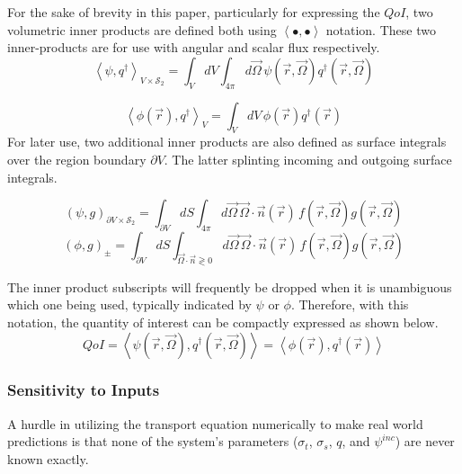 \documentclass{article}
\newcommand{\vr}{\vec{r}}
\newcommand{\vO}{\vec{\Omega}}
\newcommand{\bra}{\left\langle}
\newcommand{\ket}{\right\rangle}
\newcommand{\vn}{\vec{n}}
\newcommand{\sigt}{\sigma_t}
\newcommand{\sigs}{\sigma_s}
\newcommand{\angResp}{q^\dag}
\newcommand{\scalResp}{q^\dag}
\newcommand{\qoi}{QoI}
\begin{document}
For the sake of brevity in this paper, particularly for expressing the $\qoi$, two volumetric inner products are defined both using $\bra \bullet , \bullet \ket$ notation. These two inner-products are for use with angular and scalar flux respectively. 
\begin{equation}
\bra \psi , \angResp \ket_{V \times \mathcal{S}_2}  = \int_V dV \int_{4 \pi} d \vO \,  \psi(\vr, \vO)\angResp(\vr, \vO)
\end{equation}

\begin{equation}
\bra \phi(\vr) ,\angResp \ket_V  = \int_V dV \,  \phi(\vr)\angResp(\vr)
\end{equation}
For later use, two additional inner products are also defined as surface integrals over the region boundary $\partial V$. The latter splinting incoming and outgoing surface integrals.

\begin{equation}
( \psi , g )_{\partial V \times \mathcal{S}_2}  = \int_{\partial V} dS \int_{4 \pi} d \vO \, \vO \cdot \vn(\vr) \, f(\vr, \vO)g(\vr, \vO)
\end{equation}
\begin{equation}
( \phi , g )_{\pm}   = \int_{\partial V} dS \int_{\vO \cdot \vn \gtrless 0} d\vO \,  \vO \cdot \vn(\vr) \, f(\vr, \vO)g(\vr, \vO)
\end{equation}


The inner product subscripts will frequently be dropped when it is unambiguous which one being used, typically indicated by $\psi$ or $\phi$. Therefore, with this notation, the quantity of interest can be compactly expressed as shown below.
\begin{equation}
\label{QoIDef}
\qoi = \bra \psi(\vr,\vO), \angResp(\vr,\vO) \ket = \bra \phi(\vr) , \scalResp(\vr) \ket
\end{equation}

\subsubsection{Sensitivity to Inputs}
A hurdle in utilizing the transport equation numerically to make real world predictions is that none of the system's parameters ($\sigt$, $\sigs$, $q$, and $\psi^{inc}$) are never known exactly.


\end{document}
